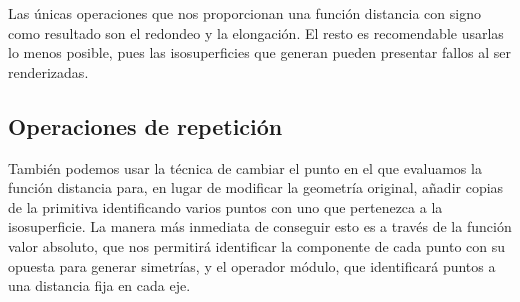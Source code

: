 Las únicas operaciones que nos proporcionan una función distancia con signo como resultado son el redondeo y la elongación. El resto es recomendable usarlas lo menos posible, pues las isosuperficies que generan pueden presentar fallos al ser renderizadas.

\subsection{Operaciones de repetición}
También podemos usar la técnica de cambiar el punto en el que evaluamos la función distancia para, en lugar de modificar la geometría original, añadir copias de la primitiva identificando varios puntos con uno que pertenezca a la isosuperficie. La manera más inmediata de conseguir esto es a través de la función valor absoluto, que nos permitirá identificar la componente de cada punto con su opuesta para generar simetrías, y el operador módulo, que identificará puntos a una distancia fija en cada eje.

